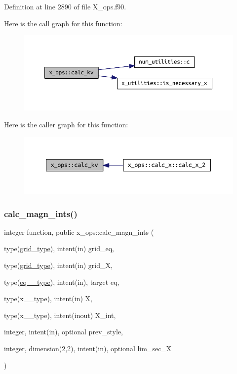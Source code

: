 Definition at line 2890 of file X\+\_\+ops.\+f90.

Here is the call graph for this function\+:\nopagebreak
\begin{figure}[H]
\begin{center}
\leavevmode
\includegraphics[width=350pt]{namespacex__ops_a045e8903230dfa0fb8b89b458d0c8ee2_cgraph}
\end{center}
\end{figure}
Here is the caller graph for this function\+:\nopagebreak
\begin{figure}[H]
\begin{center}
\leavevmode
\includegraphics[width=350pt]{namespacex__ops_a045e8903230dfa0fb8b89b458d0c8ee2_icgraph}
\end{center}
\end{figure}
\mbox{\label{namespacex__ops_a6df79622d1b95d54ab3e542751a5881d}} 
\subsubsection{\texorpdfstring{calc\+\_\+magn\+\_\+ints()}{calc\_magn\_ints()}}
{\footnotesize\ttfamily integer function, public x\+\_\+ops\+::calc\+\_\+magn\+\_\+ints (\begin{DoxyParamCaption}\item[{type(\hyperlink{structgrid__vars_1_1grid__type}{grid\+\_\+type}), intent(in)}]{grid\+\_\+eq,  }\item[{type(\hyperlink{structgrid__vars_1_1grid__type}{grid\+\_\+type}), intent(in)}]{grid\+\_\+X,  }\item[{type(\hyperlink{structeq__vars_1_1eq__2__type}{eq\+\_\+2\+\_\+type}), intent(in), target}]{eq,  }\item[{type(x\+\_\+2\+\_\+type), intent(in)}]{X,  }\item[{type(x\+\_\+2\+\_\+type), intent(inout)}]{X\+\_\+int,  }\item[{integer, intent(in), optional}]{prev\+\_\+style,  }\item[{integer, dimension(2,2), intent(in), optional}]{lim\+\_\+sec\+\_\+X }\end{DoxyParamCaption})}



